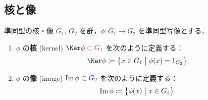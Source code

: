 \documentclass[geometry_main]{subfiles}
\begin{document}
\subsection{核と像}

\begin{mydef}[label=def.ker_group]{準同型の核・像}
	$G_1,\, G_2$ を群，$\phi \colon G_1 \to G_2$ を準同型写像とする．
	\begin{enumerate}
		\item $\phi$ の\textbf{核} (kernel) $\Ker \phi \; \textcolor{red}{\subset G_1}$ を次のように定義する：
		\begin{align}
			\Ker \phi \coloneqq \bigl\{ x \in G_1 \bigm| \phi(x) = 1_{G_2} \bigr\} 
		\end{align}
		\item $\phi$ の\textbf{像} (image) $\Im \phi \; \textcolor{blue}{\subset G_2}$ を次のように定義する：
		\begin{align}
			\Im \phi \coloneqq \bigl\{ \phi(x) \bigm| x \in G_1 \bigr\} 
		\end{align}
	\end{enumerate}
\end{mydef}
\end{document}
